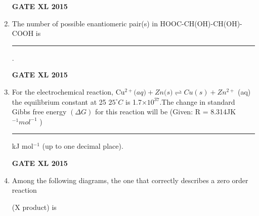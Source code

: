 \documentclass[journal,12pt,onecolumn]{IEEEtran}
\begin{document}
\begin{enumerate}
\begin{enumerate}
    \end{enumerate}
\begin{flushright}\textbf{GATE XL 2015}\end{flushright}
\item The number of possible enantiomeric pair(s) in HOOC-CH(OH)-CH(OH)-COOH is \rule{1cm}{0.15mm}.
\begin{flushright}\textbf{GATE XL 2015}\end{flushright}
\item For the electrochemical reaction, Cu$^{2+}\textit{(aq)}+Zn\textit{(s)} \rightleftharpoons Cu(s) +Zn^{2+}$ (aq) the equilibrium constant at 25 $25^{\circ} C$ is 1.7$\times 10 ^{37}$.The change in standard Gibbs free energy $(\Delta G)$ for this reaction will be (Given: R = 8.314JK $^ {- 1} mol ^{- 1}$ )\rule{1cm}{0.15mm} kJ mol$^{-1}$ (up to one decimal place).
\begin{flushright}\textbf{GATE XL 2015}\end{flushright}
\item Among the following diagrams, the one that correctly describes a zero order reaction

(X product) is


\end{enumerate}
\end{document}
